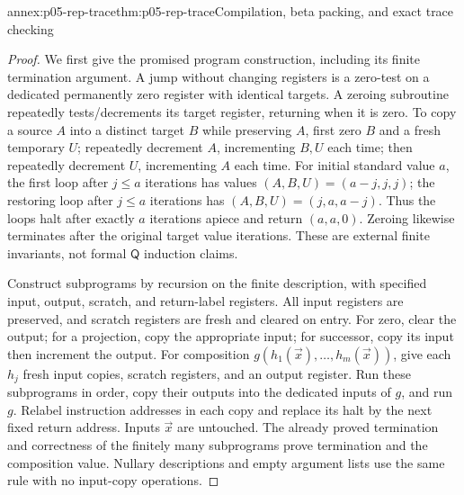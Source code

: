 \begin{annexitem}{annex:p05-rep-trace}{thm:p05-rep-trace}{Compilation, beta packing, and exact trace checking}
\begin{proof}
We first give the promised program construction, including its finite
termination argument. A jump without changing registers is a zero-test
on a dedicated permanently zero register with identical targets.
A zeroing subroutine repeatedly tests/decrements its target register,
returning when it is zero. To copy a source \(A\) into a distinct target
\(B\) while preserving \(A\), first zero \(B\) and a fresh temporary
\(U\); repeatedly decrement \(A\), incrementing \(B,U\) each time;
then repeatedly decrement \(U\), incrementing \(A\) each time.
For initial standard value \(a\), the first loop after \(j\leq a\)
iterations has values \((A,B,U)=(a-j,j,j)\); the restoring loop after
\(j\leq a\) iterations has \((A,B,U)=(j,a,a-j)\).
Thus the loops halt after exactly \(a\) iterations apiece and return
\((a,a,0)\). Zeroing likewise terminates after the original target
value iterations. These are external finite invariants, not formal
\(\mathsf Q\) induction claims.

Construct subprograms by recursion on the finite description, with
specified input, output, scratch, and return-label registers. All input
registers are preserved, and scratch registers are fresh and cleared on
entry. For zero, clear the output; for a projection, copy the appropriate
input; for successor, copy its input then increment the output.
For composition \(g(h_1(\vec x),\ldots,h_m(\vec x))\), give each
\(h_j\) fresh input copies, scratch registers, and an output register.
Run these subprograms in order, copy their outputs into the dedicated
inputs of \(g\), and run \(g\). Relabel instruction addresses in each
copy and replace its halt by the next fixed return address. Inputs
\(\vec x\) are untouched. The already proved termination and correctness
of the finitely many subprograms prove termination and the composition
value. Nullary descriptions and empty argument lists use the same rule
with no input-copy operations.


\end{proof}
\end{annexitem}
